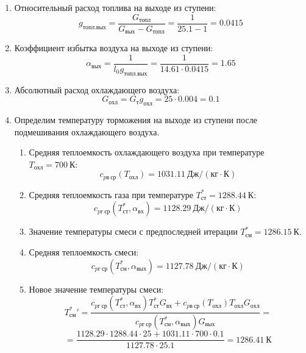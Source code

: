 \documentclass[a4paper,10pt]{article}
\begin{document}
\begin{enumerate}
        \item Относительный расход топлива на выходе из ступени:
        \[
            g_{топл.вых} = \frac{ G_{топл} }{ G_{вых} - G_{топл} } =
                 \frac{ 1 }{ 25.1 - 1 } =
            0.0415
        \]

        \item Коэффициент избытка воздуха на выходе из ступени:
        \[
            \alpha_{вых} = \frac{ 1 }{ l_0 g_{топл.вых} } =
                \frac{ 1 }{ 14.61 \cdot 0.0415 } =
            1.65
        \]

        \item Абсолютный расход охлаждающего воздуха:
        \[
            G_{охл} = G_т g_{охл} = 25 \cdot 0.004 =
            0.1
        \]

        \item Определим температуру торможения на выходе из ступени после подмешивания охлаждающего воздуха.
        \begin{enumerate}

            \item Средняя теплоемкость охлаждающего воздуха при температуре $T_{охл} = 700\ К $:
            \[
                c_{pв\ ср} (T_{охл}) = 1031.11\ Дж/ (кг \cdot К)
            \]

            \item Средняя теплоемкость газа при температуре $T_{ст}^* = 1288.44 \ К $:
            \[
                c_{pг\ ср} (T_{ст}^*, \alpha_{вх}) =
                1128.29\ Дж/ (кг \cdot К)
            \]

            \item Значение температуры смеси с предпоследней итерации $T_{см}^{*} = 1286.15\ К$.

            \item Средняя теплоемкость смеси:
            \[
                c_{pг\ ср} (T_{см}^{*}, \alpha_{вых}) =
                1127.78\ Дж/ (кг \cdot К)
            \]

            \item Новое значение температуры смеси:
            \[
                T_{см}^*\prime = \frac{
                        c_{pг\ ср} (T_{ст}^*, \alpha_{вх}) T_{ст}^* G_{вх} + c_{pв\ ср} (T_{охл}) T_{охл} G_{охл}
                    }{
                        c_{pг\ ср} (T_{см}^{*}, \alpha_{вых}) G_{вых}
                    } =
            \]
            \[    = \frac{
                    1128.29
                    \cdot 1288.44 \cdot 25 +
                    1031.11
                    \cdot 700 \cdot 0.1
                }{
                    1127.78
                    \cdot  25.1
                } =
                1286.41\ К
            \]


\end{enumerate}
\end{enumerate}
\end{document}
